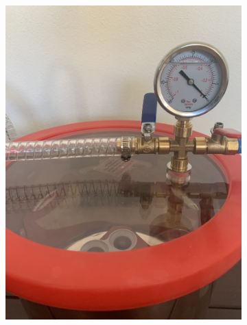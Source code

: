 \documentclass[twoside]{article}
\begin{document}
\begin{figure}[H]
\begin{subfigure}[b]{0.33\linewidth}
		\includegraphics[width=\textwidth]{vacume}
	\end{subfigure}%
	\begin{subfigure}[b]{0.33\linewidth}
		\centering

\end{subfigure}
\end{figure}
\end{document}
